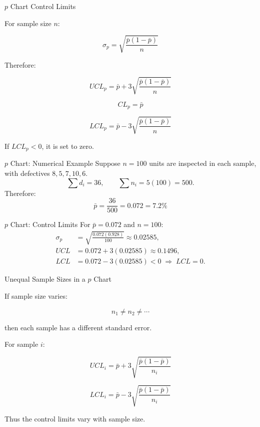 \documentclass[aspectratio=169,10pt]{beamer}
\begin{document}

\begin{frame}[shrink=18]{$p$ Chart Control Limits}
\small

For sample size \(n\):

\[
\sigma_p=
\sqrt{
\frac{\bar p(1-\bar p)}{n}
}
\]

Therefore:

\[
\boxed{
UCL_p=
\bar p+
3
\sqrt{
\frac{\bar p(1-\bar p)}{n}
}
}
\]

\[
\boxed{
CL_p=\bar p
}
\]

\[
\boxed{
LCL_p=
\bar p-
3
\sqrt{
\frac{\bar p(1-\bar p)}{n}
}
}
\]

If \(LCL_p<0\), it is set to zero.

\end{frame}


\begin{frame}{$p$ Chart: Numerical Example}
\small
Suppose $n=100$ units are inspected in each sample, with defectives $8,5,7,10,6$.
\[
\sum d_i=36,\qquad \sum n_i=5(100)=500.
\]
Therefore:
\[
\boxed{\bar p=\frac{36}{500}=0.072=7.2\%}
\]
\end{frame}


\begin{frame}{$p$ Chart: Control Limits}
\small
For $\bar p=0.072$ and $n=100$:
\begin{align*}
\sigma_p&=\sqrt{\frac{0.072(0.928)}{100}}\approx0.02585,\\
UCL&=0.072+3(0.02585)\approx0.1496,\\
LCL&=0.072-3(0.02585)<0\;\Rightarrow\;LCL=0.
\end{align*}
\end{frame}


\begin{frame}[shrink=18]{Unequal Sample Sizes in a $p$ Chart}
\small

If sample size varies:

\[
n_1\neq n_2\neq\cdots
\]

then each sample has a different standard error.

For sample \(i\):

\[
\boxed{
UCL_i=
\bar p+
3
\sqrt{
\frac{\bar p(1-\bar p)}{n_i}
}
}
\]

\[
\boxed{
LCL_i=
\bar p-
3
\sqrt{
\frac{\bar p(1-\bar p)}{n_i}
}
}
\]

Thus the control limits vary with sample size.

\end{frame}
\end{document}
